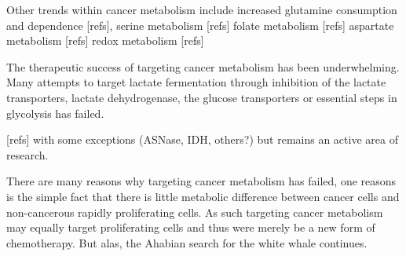Other trends within cancer metabolism include increased glutamine consumption and dependence [refs],
serine metabolism [refs]
folate metabolism [refs]
aspartate metabolism [refs]
redox metabolism [refs]

The therapeutic success of targeting cancer metabolism has been underwhelming.
Many attempts to target lactate fermentation through inhibition of the lactate transporters, lactate dehydrogenase, the glucose transporters or essential steps in glycolysis has failed.

[refs] with some exceptions (ASNase, IDH, others?) but remains an active area of research.

There are many reasons why targeting cancer metabolism has failed, one reasons is the simple fact that there is little metabolic difference between cancer cells and non-cancerous rapidly proliferating cells.
As such targeting cancer metabolism may equally target proliferating cells and thus were merely be a new form of chemotherapy.
But alas, the Ahabian search for the white whale continues.

















